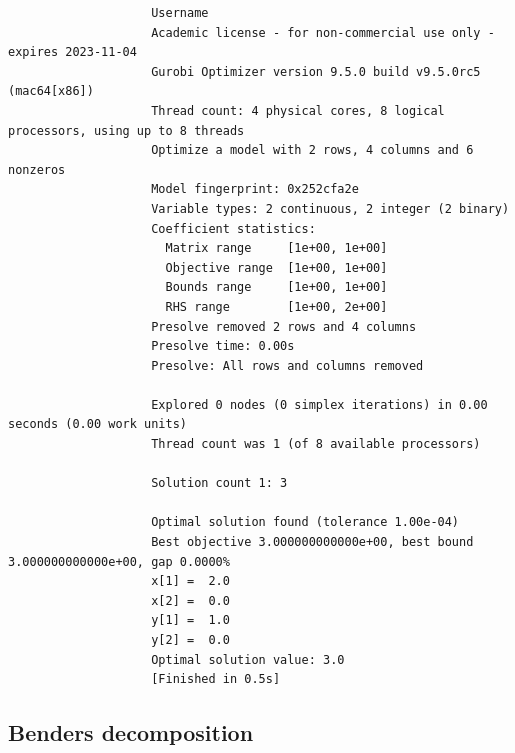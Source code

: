 \vfill 
{\tiny

\begin{verbatim}
                    Username
                    Academic license - for non-commercial use only - expires 2023-11-04
                    Gurobi Optimizer version 9.5.0 build v9.5.0rc5 (mac64[x86])
                    Thread count: 4 physical cores, 8 logical processors, using up to 8 threads
                    Optimize a model with 2 rows, 4 columns and 6 nonzeros
                    Model fingerprint: 0x252cfa2e
                    Variable types: 2 continuous, 2 integer (2 binary)
                    Coefficient statistics:
                      Matrix range     [1e+00, 1e+00]
                      Objective range  [1e+00, 1e+00]
                      Bounds range     [1e+00, 1e+00]
                      RHS range        [1e+00, 2e+00]
                    Presolve removed 2 rows and 4 columns
                    Presolve time: 0.00s
                    Presolve: All rows and columns removed
                    
                    Explored 0 nodes (0 simplex iterations) in 0.00 seconds (0.00 work units)
                    Thread count was 1 (of 8 available processors)
                    
                    Solution count 1: 3 
                    
                    Optimal solution found (tolerance 1.00e-04)
                    Best objective 3.000000000000e+00, best bound 3.000000000000e+00, gap 0.0000%
                    x[1] =  2.0
                    x[2] =  0.0
                    y[1] =  1.0
                    y[2] =  0.0
                    Optimal solution value: 3.0
                    [Finished in 0.5s]
\end{verbatim}
}

\vfill 


\newpage{}

\subsection*{Benders decomposition}
{}



